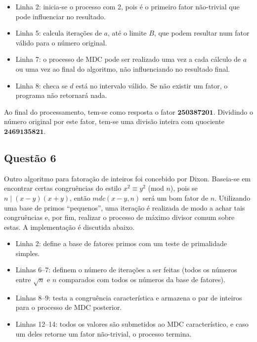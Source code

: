 \documentclass{../sftex/sftex}
\begin{document}
\begin{itemize}

    

    \item Linha 2: inicia-se o processo com 2, pois é o primeiro fator
        não-trivial que pode influenciar no resultado.

    \item Linha 5: calcula iterações de $a$, até o limite $B$, que podem
        resultar num fator válido para o número original.

    \item Linha 7: o processo de MDC pode ser realizado uma vez a cada
        cálculo de $a$ ou uma vez ao final do algoritmo, não influenciando no
        resultado final.

    \item Linha 8: checa se $d$ está no intervalo válido. Se não existir um
        fator, o programa não retornará nada.

\end{itemize}

Ao final do processamento, tem-se como resposta o fator $\textbf{250387201}$.
Dividindo o número original por este fator, tem-se uma divisão inteira com
quociente $\textbf{2469135821}$.

\subsection*{Questão 6}

Outro algoritmo para fatoração de inteiros foi concebido por Dixon. Baseia-se
em encontrar certas congruências do estilo $x^2 \equiv y^2$ (mod $n$), pois se
$n \mid (x-y)(x+y)$, então $mdc(x-y, n)$ será um bom fator de $n$. Utilizando
uma base de primos ``pequenos'', uma iteração é realizada de modo a achar tais
congruências e, por fim, realizar o processo de máximo divisor comum sobre
estas. A implementação é discutida abaixo.

\begin{itemize}

    

    \item Linha 2: define a base de fatores primos com um teste de primalidade
        simples.

    \item Linhas 6--7: definem o número de iterações a ser feitas (todos os
        números entre $\sqrt{n}$ e $n$ comparados com todos os números da base
        de fatores).

    \item Linhas 8--9: testa a congruência característica e armazena o par de
        inteiros para o processo de MDC posterior.

    \item Linhas 12--14: todos os valores são submetidos ao MDC característico,
        e caso um deles retorne um fator não-trivial, o processo termina.

\end{itemize}
\end{document}
